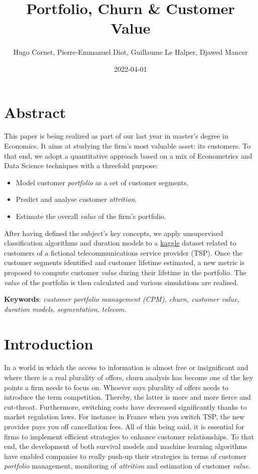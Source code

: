 \documentclass[
]{book}
\title{Portfolio, Churn \& Customer Value}
\author{Hugo Cornet, Pierre-Emmanuel Diot, Guillaume Le Halper, Djawed Mancer}
\date{2022-04-01}
\providecommand{\tightlist}{%
  \setlength{\itemsep}{0pt}\setlength{\parskip}{0pt}}
\begin{document}
\maketitle

{
\setcounter{tocdepth}{1}
\tableofcontents
}
\hypertarget{abstract}{%
\chapter*{Abstract}\label{abstract}}

This paper is being realized as part of our last year in master's degree in Economics. It aims at studying the firm's most valuable asset: its customers. To that end, we adopt a quantitative approach based on a mix of Econometrics and Data Science techniques with a threefold purpose:

\begin{itemize}
\tightlist
\item
  Model customer \emph{portfolio} as a set of customer segments.
\item
  Predict and analyse customer \emph{attrition}.
\item
  Estimate the overall \emph{value} of the firm's portfolio.
\end{itemize}

After having defined the subject's key concepts, we apply unsupervised classification algorithms and duration models to a \href{https://www.kaggle.com/yeanzc/telco-customer-churn-ibm-dataset}{kaggle} dataset related to customers of a fictional telecommunications service provider (TSP). Once the customer segments identified and customer lifetime estimated, a new metric is proposed to compute customer \emph{value} during their lifetime in the portfolio. The \emph{value} of the portfolio is then calculated and various simulations are realised.

\textbf{Keywords}: \emph{customer portfolio management (CPM), churn, customer value, duration models, segmentation, telecom.}

\hypertarget{intro}{%
\chapter{Introduction}\label{intro}}

In a world in which the access to information is almost free or insignificant and where there is a real plurality of offers, churn analysis has become one of the key points a firm needs to focus on. Whoever says plurality of offers needs to introduce the term competition. Thereby, the latter is more and more fierce and cut-throat. Furthermore, switching costs have decreased significantly thanks to market regulation laws. For instance in France when you switch TSP, the new provider pays you off cancellation fees. All of this being said, it is essential for firms to implement efficient strategies to enhance customer relationships. To that end, the development of both survival models and machine learning algorithms have enabled companies to really push-up their strategies in terms of customer \emph{portfolio} management, monitoring of \emph{attrition} and estimation of customer \emph{value}.
\end{document}
